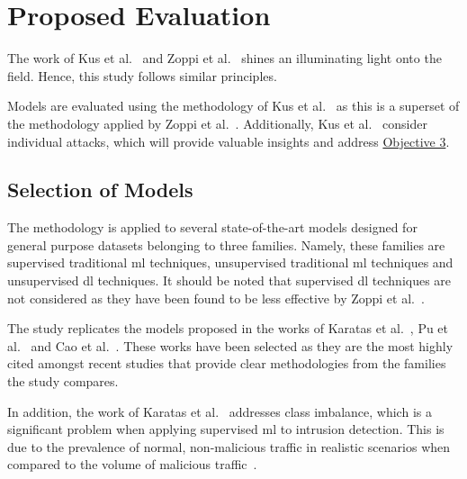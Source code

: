 \chapter{Proposed Evaluation}%
\label{chp:evaluation}

The work of Kus et al.~\cite{Kus} and Zoppi et al.~\cite{Zoppi} shines an
illuminating light onto the field. Hence, this study follows similar
principles.


Models are evaluated using the methodology of Kus et al.~\cite{Kus} as this
is a superset of the methodology applied by Zoppi et al.~\cite{Zoppi}.
Additionally, Kus et al.~\cite{Kus} consider individual attacks, which will
provide valuable insights and address \hyperlink{obj3}{Objective 3}.

\section{Selection of Models}%
\label{sec:models}

The methodology is applied to several state-of-the-art models designed for
general purpose datasets belonging to three families. Namely, these families
are supervised traditional \gls{ml} techniques, unsupervised traditional
\gls{ml} techniques and unsupervised \gls{dl} techniques. It should be noted
that supervised \gls{dl} techniques are not considered as they have been
found to be less effective by Zoppi et al.~\cite{Zoppi}.

The study replicates the models proposed in the works of Karatas et
al.~\cite{Karatas}, Pu et al.~\cite{Pu} and Cao et al.~\cite{Cao}. These works
have been selected as they are the most highly cited amongst recent studies
that provide clear methodologies from the families the study compares.

In addition, the work of Karatas et al.~\cite{Karatas} addresses class
imbalance, which is a significant problem when applying supervised \gls{ml} to
intrusion detection. This is due to the prevalence of normal, non-malicious
traffic in realistic scenarios when compared to the volume of malicious
traffic~\cite{imbalance}.

